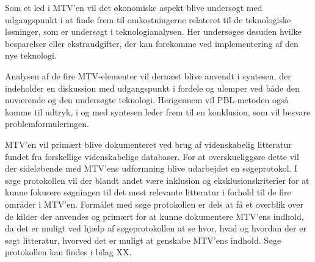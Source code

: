 Som et led i MTV'en vil det økonomiske aspekt blive undersøgt med udgangspunkt i at finde frem til omkostningerne relateret til de teknologiske løsninger, som er undersøgt i teknologianalysen. Her undersøges desuden hvilke besparelser eller ekstraudgifter, der kan forekomme ved implementering af den nye teknologi.

Analysen af de fire MTV-elementer vil dernæst blive anvendt i syntesen, der indeholder en diskussion med udgangspunkt i fordele og ulemper ved både den nuværende og den undersøgte teknologi. Herigennem vil PBL-metoden også komme til udtryk, i og med syntesen leder frem til en konklusion, som vil besvare problemformuleringen.

MTV’en vil primært blive dokumenteret ved brug af videnskabelig litteratur fundet fra forskellige videnskabelige databaser. For at overskueliggøre dette vil der sideløbende med MTV’ens udformning blive udarbejdet en søgeprotokol. I søge protokollen vil der blandt andet være inklusion og eksklusionskriterier  for at kunne fokusere søgningen til det mest relevante litteratur i forhold til de fire områder i MTV’en. Formålet med søge protokollen er dels at få et overblik over de kilder der anvendes og primært for at kunne dokumentere MTV’ens indhold, da det er muligt ved hjælp af søgeprotokollen at se hvor, hvad og hvordan der er søgt litteratur, hvorved det er muligt at genskabe MTV’ens indhold. Søge protokollen kan findes i bilag XX.





